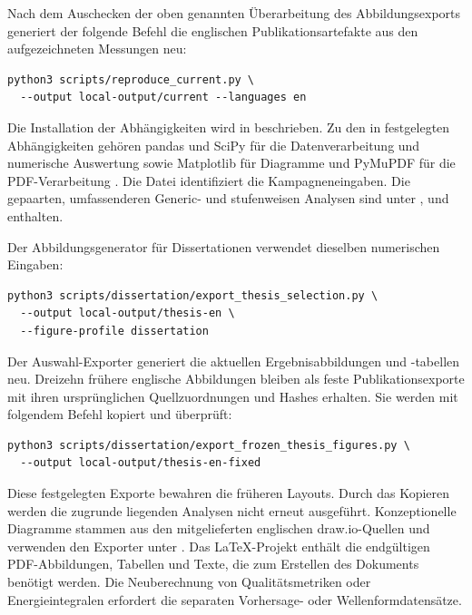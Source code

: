 Nach dem Auschecken der oben genannten Überarbeitung des Abbildungsexports generiert der folgende Befehl die englischen Publikationsartefakte aus den aufgezeichneten Messungen neu:
\begin{lstlisting}[language={},basicstyle=\ttfamily\footnotesize]
python3 scripts/reproduce_current.py \
  --output local-output/current --languages en
\end{lstlisting}
Die Installation der Abhängigkeiten wird in  beschrieben. Zu den in  festgelegten Abhängigkeiten gehören pandas und SciPy für die Datenverarbeitung und numerische Auswertung \cite{mckinney2010pandas,virtanen2020scipy} sowie Matplotlib für Diagramme und PyMuPDF für die PDF-Verarbeitung \cite{hunter2007matplotlib,pymupdf_docs}. Die Datei  identifiziert die Kampagneneingaben. Die gepaarten, umfassenderen Generic- und stufenweisen Analysen sind unter ,  und  enthalten.

Der Abbildungsgenerator für Dissertationen verwendet dieselben numerischen Eingaben:
\begin{lstlisting}[language={},basicstyle=\ttfamily\footnotesize]
python3 scripts/dissertation/export_thesis_selection.py \
  --output local-output/thesis-en \
  --figure-profile dissertation
\end{lstlisting}
Der Auswahl-Exporter generiert die aktuellen Ergebnisabbildungen und -tabellen neu. Dreizehn frühere englische Abbildungen bleiben als feste Publikationsexporte mit ihren ursprünglichen Quellzuordnungen und Hashes erhalten. Sie werden mit folgendem Befehl kopiert und überprüft:
\begin{lstlisting}[language={},basicstyle=\ttfamily\footnotesize]
python3 scripts/dissertation/export_frozen_thesis_figures.py \
  --output local-output/thesis-en-fixed
\end{lstlisting}
Diese festgelegten Exporte bewahren die früheren Layouts. Durch das Kopieren werden die zugrunde liegenden Analysen nicht erneut ausgeführt. Konzeptionelle Diagramme stammen aus den mitgelieferten englischen draw.io-Quellen \cite{drawio_documentation} und verwenden den Exporter unter . Das LaTeX-Projekt enthält die endgültigen PDF-Abbildungen, Tabellen und Texte, die zum Erstellen des Dokuments benötigt werden. Die Neuberechnung von Qualitätsmetriken oder Energieintegralen erfordert die separaten Vorhersage- oder Wellenformdatensätze.

